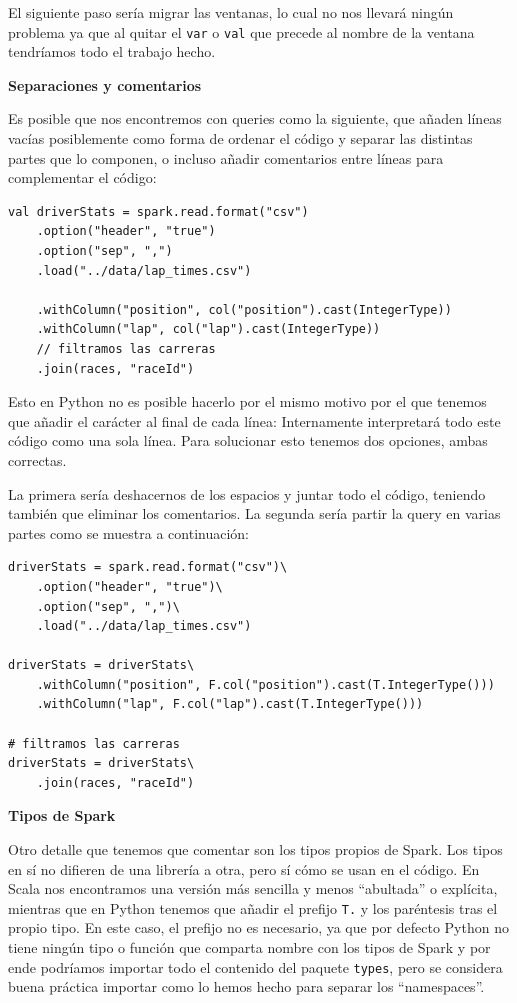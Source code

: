 \documentclass[12pt,twoside,titlepage]{report}
\newcommand{\quotes}[1]{``#1''}
\begin{document}
El siguiente paso sería migrar las ventanas, lo cual no nos llevará ningún problema ya que al quitar el \texttt{var} o \texttt{val} que precede al nombre de la ventana tendríamos todo el trabajo hecho.

\textbf{Separaciones y comentarios}

Es posible que nos encontremos con queries como la siguiente, que añaden líneas vacías posiblemente como forma de ordenar el código y separar las distintas partes que lo componen, o incluso añadir comentarios entre líneas para complementar el código:

\begin{lstlisting}
val driverStats = spark.read.format("csv")
	.option("header", "true")
	.option("sep", ",")
	.load("../data/lap_times.csv")

	.withColumn("position", col("position").cast(IntegerType)) 
	.withColumn("lap", col("lap").cast(IntegerType)) 
	// filtramos las carreras
	.join(races, "raceId")
\end{lstlisting}

Esto en Python no es posible hacerlo por el mismo motivo por el que tenemos que añadir el carácter \texttt{} al final de cada línea: Internamente interpretará todo este código como una sola línea. Para solucionar esto tenemos dos opciones, ambas correctas.

La primera sería deshacernos de los espacios y juntar todo el código, teniendo también que eliminar los comentarios. La segunda sería partir la query en varias partes como se muestra a continuación:

\begin{lstlisting}
driverStats = spark.read.format("csv")\
	.option("header", "true")\
	.option("sep", ",")\
	.load("../data/lap_times.csv")
	
driverStats = driverStats\
	.withColumn("position", F.col("position").cast(T.IntegerType())) 
	.withColumn("lap", F.col("lap").cast(T.IntegerType())) 
	
# filtramos las carreras
driverStats = driverStats\
	.join(races, "raceId")
\end{lstlisting}


\textbf{Tipos de Spark}

Otro detalle que tenemos que comentar son los tipos propios de Spark. Los tipos en sí no difieren de una librería a otra, pero sí cómo se usan en el código. En Scala nos encontramos una versión más sencilla y menos \quotes{abultada} o explícita, mientras que en Python tenemos que añadir el prefijo \texttt{T.} y los paréntesis tras el propio tipo. En este caso, el prefijo no es necesario, ya que por defecto Python no tiene ningún tipo o función que comparta nombre con los tipos de Spark y por ende podríamos importar todo el contenido del paquete \texttt{types}, pero se considera buena práctica importar como lo hemos hecho para separar los \quotes{namespaces}. 
\end{document}
